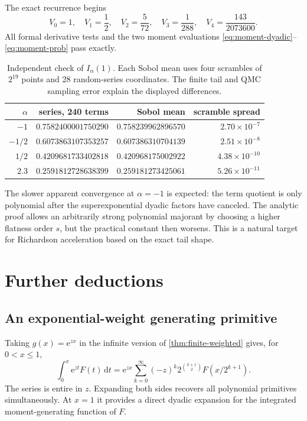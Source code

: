 \documentclass[11pt,oneside]{article}
\numberwithin{equation}{section}
\theoremstyle{definition}
\theoremstyle{remark}
\newcommand{\e}{\mathrm e}
\newcommand{\dd}{\,\mathrm d}
\begin{document}
The exact recurrence begins
\begin{equation}
 V_0=1,\quad V_1=\frac12,\quad V_2=\frac5{72},\quad
 V_3=\frac1{288},\quad V_4=\frac{143}{2073600}.            \label{eq:V-first}
\end{equation}
All formal derivative tests and the two moment evaluations
\eqref{eq:moment-dyadic}--\eqref{eq:moment-prob} pass exactly.

\begin{table}[ht]
\centering
\small
\begin{tabular}{@{}rrrr@{}}
\toprule
$\alpha$ & series, 240 terms & Sobol mean & scramble spread \\
\midrule
$-1$   & $0.7582400001750290$ & $0.758239962896570$ & $2.70\times10^{-7}$\\
$-1/2$ & $0.6073863107353257$ & $0.607386310704139$ & $2.51\times10^{-8}$\\
$1/2$  & $0.4209681733402818$ & $0.420968175002922$ & $4.38\times10^{-10}$\\
$2.3$  & $0.2591812728638399$ & $0.259181273425061$ & $5.26\times10^{-11}$\\
\bottomrule
\end{tabular}
\caption{Independent check of $I_\alpha(1)$.  Each Sobol mean uses four
scrambles of $2^{19}$ points and 28 random-series coordinates.  The finite tail
and QMC sampling error explain the displayed differences.}
\label{tab:numerics}
\end{table}

The slower apparent convergence at $\alpha=-1$ is expected: the term quotient
is only polynomial after the superexponential dyadic factors have canceled.
The analytic proof allows an arbitrarily strong polynomial majorant by choosing
a higher flatness order $s$, but the practical constant then worsens.  This is
a natural target for Richardson acceleration based on the exact tail shape.

\section{Further deductions}
\label{sec:further}

\subsection{An exponential-weight generating primitive}
Taking $g(x)=\e^{zx}$ in the infinite version of
\cref{thm:finite-weighted} gives, for $0<x\le1$,
\begin{equation}
 \int_0^x\e^{zt}F(t)\dd t
 =\e^{zx}\sum_{k=0}^{\infty}(-z)^k
 2^{\binom{k+1}{2}}F(x/2^{k+1}).                          \label{eq:exponential-primitive}
\end{equation}
The series is entire in $z$.  Expanding both sides recovers all polynomial
primitives simultaneously.  At $x=1$ it provides a direct dyadic expansion for
the integrated moment-generating function of $F$.
\end{document}
